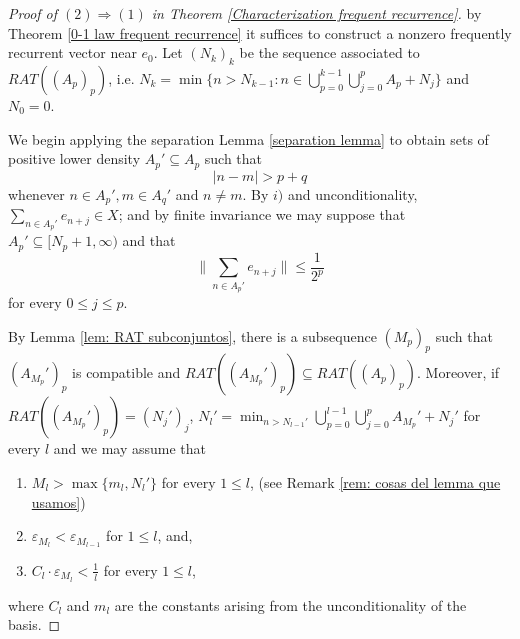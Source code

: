 \documentclass[11pt]{amsart}
\newcommand{\sub}{\subseteq}
\begin{document}
\begin{proof}[Proof of  $(2)\Rightarrow (1)$ in Theorem \ref{Characterization frequent recurrence}]    
 by Theorem \ref{0-1 law frequent recurrence} it suffices to construct a nonzero frequently recurrent vector near $e_0$. Let $(N_k)_k$ be the sequence associated to $RAT((A_p)_p)$, i.e. $N_k=\min \{n>N_{k-1}: n\in \bigcup_{p=0}^{k-1} \bigcup_{j=0}^p A_p+N_j\}$ and $N_0=0.$

We begin applying the separation Lemma \ref{separation lemma} to obtain sets of positive lower density $A_p'\subseteq A_p$  such that 
\begin{equation}\label{eq: caracterizacion 1 separation de los A_p}
    |n-m|>p+q
\end{equation} whenever $n\in A_p',m\in A_q'$ and $n\neq m$. By $i)$ and unconditionality,  $\sum_{n\in A_p'} e_{n+j}\in X$; and by finite invariance we may suppose that  $A_p'\sub [N_{p}+1,\infty)$ and that 
\begin{equation}\label{eq: caracterizacion 1 finitely invariance}
    \|\sum_{n\in A_p'} e_{n+j}\|\leq \frac{1}{2^p}
\end{equation} for every $0\le j\le p$.

By Lemma \ref{lem: RAT subconjuntos}, there is a subsequence $(M_p)_p$ such that $(A_{M_p}')_p$ is compatible and $RAT((A_{M_p}')_p)\sub RAT((A_p)_p)$.
 Moreover, if $RAT((A_{M_p}')_p)=(N_j')_j$, $N_{l}'=\min_{n>N_{l-1}'} \bigcup_{p=0}^{l-1} \bigcup_{j=0}^p A_{M_p}'+N_j'$ for every $l$ and we may assume that 
\begin{enumerate}
   \item[a)] \label{eq: caracterizacion 1 Los M_l son grandes} $M_{l}>\max\{m_{l},N_l'\}$ for every $1\leq l$, (see Remark \ref{rem: cosas del lemma que usamos})
   \item [b)] $\varepsilon_{M_l}<\varepsilon_{M_{l-1}}$ for $1\leq l$, and,
    \item [c)] $C_l\cdot\varepsilon_{M_l}<\frac{1}{l}$ for every $1\leq l$,
\end{enumerate}
where $C_l$ and $m_l$ are the constants arising     from the unconditionality of the basis.


\end{proof}
\end{document}
